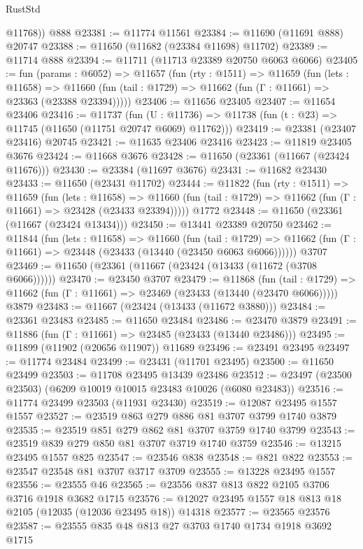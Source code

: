 \begin{lexlean}{RustStd}
\begin{coremodule}
        @11768))
    @888
@23381 := @11774 @11561
@23384 := @11690 (@11691 @888) @20747
@23388 := @11650 (@11682 (@23384 @11698) @11702)
@23389 := @11714 @888
@23394 := @11711 (@11713 @23389 @20750 @6063 @6066)
@23405 := fun (params : @6052) =>
  @11657
    (fun (rty : @1511) =>
    @11659
      (fun (lets : @11658) =>
      @11660 (fun (tail : @1729) => @11662 (fun (Γ : @11661) => @23363 (@23388 @23394)))))
@23406 := @11656 @23405
@23407 := @11654 @23406
@23416 := @11737
    (fun (U : @11736) => @11738 (fun (t : @23) => @11745 (@11650 (@11751 @20747 @6069) @11762)))
@23419 := @23381 (@23407 @23416) @20745
@23421 := @11635 @23406 @23416
@23423 := @11819 @23405 @3676
@23424 := @11668 @3676
@23428 := @11650 (@23361 (@11667 (@23424 @11676)))
@23430 := @23384 (@11697 @3676)
@23431 := @11682 @23430
@23433 := @11650 (@23431 @11702)
@23444 := @11822
    (fun (rty : @1511) =>
    @11659
      (fun (lets : @11658) =>
      @11660 (fun (tail : @1729) => @11662 (fun (Γ : @11661) => @23428 (@23433 @23394)))))
    @1772
@23448 := @11650 (@23361 (@11667 (@23424 @13434)))
@23450 := @13441 @23389 @20750
@23462 := @11844
    (fun (lets : @11658) =>
    @11660
      (fun (tail : @1729) =>
      @11662 (fun (Γ : @11661) => @23448 (@23433 (@13440 (@23450 @6063 @6066))))))
    @3707
@23469 := @11650 (@23361 (@11667 (@23424 (@13433 (@11672 (@3708 @6066))))))
@23470 := @23450 @3707
@23479 := @11868
    (fun (tail : @1729) => @11662 (fun (Γ : @11661) => @23469 (@23433 (@13440 (@23470 @6066)))))
    @3879
@23483 := @11667 (@23424 (@13433 (@11672 @3880)))
@23484 := @23361 @23483
@23485 := @11650 @23484
@23486 := @23470 @3879
@23491 := @11886 (fun (Γ : @11661) => @23485 (@23433 (@13440 @23486)))
@23495 := @11899 (@11902 (@20656 @11907)) @11689
@23496 := @23491 @23495
@23497 := @11774 @23484
@23499 := @23431 (@11701 @23495)
@23500 := @11650 @23499
@23503 := @11708 @23495 @13439 @23486
@23512 := @23497 (@23500 @23503) (@6209 @10019 @10015 @23483 @10026 (@6080 @23483))
@23516 := @11774 @23499 @23503 (@11931 @23430)
@23519 := @12087 @23495 @1557 @1557
@23527 := @23519 @863 @279 @886 @81 @3707 @3799 @1740 @3879
@23535 := @23519 @851 @279 @862 @81 @3707 @3759 @1740 @3799
@23543 := @23519 @839 @279 @850 @81 @3707 @3719 @1740 @3759
@23546 := @13215 @23495 @1557 @825
@23547 := @23546 @838
@23548 := @821 @822
@23553 := @23547 @23548 @81 @3707 @3717 @3709
@23555 := @13228 @23495 @1557
@23556 := @23555 @46
@23565 := @23556 @837 @813 @822 @2105 @3706 @3716 @1918 @3682 @1715
@23576 := @12027 @23495 @1557 @18 @813 @18 @2105 (@12035 (@12036 @23495 @18)) @14318
@23577 := @23565 @23576
@23587 := @23555 @835 @48 @813 @27 @3703 @1740 @1734 @1918 @3692 @1715

\end{coremodule}
\end{lexlean}
